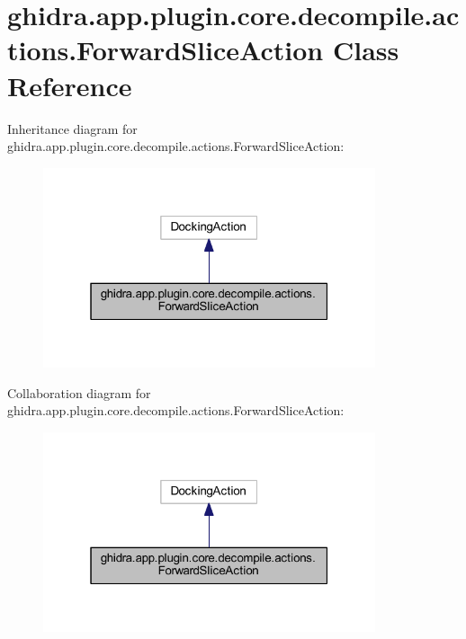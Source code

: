 \hypertarget{classghidra_1_1app_1_1plugin_1_1core_1_1decompile_1_1actions_1_1_forward_slice_action}{}\section{ghidra.\+app.\+plugin.\+core.\+decompile.\+actions.\+Forward\+Slice\+Action Class Reference}
\label{classghidra_1_1app_1_1plugin_1_1core_1_1decompile_1_1actions_1_1_forward_slice_action}


Inheritance diagram for ghidra.\+app.\+plugin.\+core.\+decompile.\+actions.\+Forward\+Slice\+Action\+:
\nopagebreak
\begin{figure}[H]
\begin{center}
\leavevmode
\includegraphics[width=277pt]{classghidra_1_1app_1_1plugin_1_1core_1_1decompile_1_1actions_1_1_forward_slice_action__inherit__graph}
\end{center}
\end{figure}


Collaboration diagram for ghidra.\+app.\+plugin.\+core.\+decompile.\+actions.\+Forward\+Slice\+Action\+:
\nopagebreak
\begin{figure}[H]
\begin{center}
\leavevmode
\includegraphics[width=277pt]{classghidra_1_1app_1_1plugin_1_1core_1_1decompile_1_1actions_1_1_forward_slice_action__coll__graph}
\end{center}
\end{figure}
